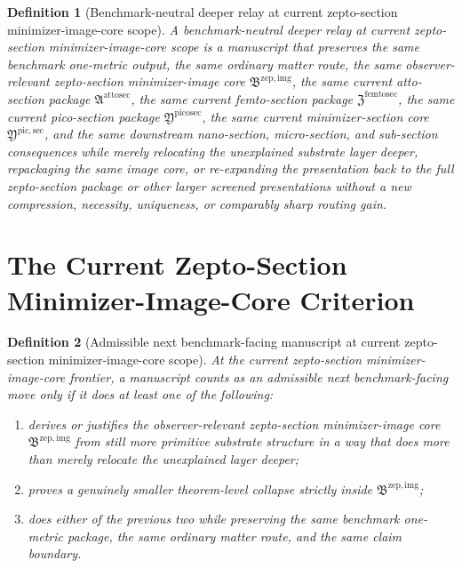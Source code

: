 \documentclass[11pt]{article}
\newcommand{\AttoSectionPackage}{\mathfrak A^{\mathrm{attosec}}}
\newcommand{\ZeptoImageCore}{\mathfrak B^{\mathrm{zep,img}}}
\newcommand{\FemtoSectionPackage}{\mathfrak Z^{\mathrm{femtosec}}}
\newcommand{\PicoSectionPackage}{\mathfrak Y^{\mathrm{picosec}}}
\newcommand{\PicoMinSectionCore}{\mathfrak Y^{\mathrm{pic,sec}}}
\newtheorem{definition}{Definition}
\begin{document}
\begin{definition}[Benchmark-neutral deeper relay at current zepto-section minimizer-image-core scope]
A \emph{benchmark-neutral deeper relay at current zepto-section minimizer-image-core scope} is a manuscript that preserves the same benchmark one-metric output, the same ordinary matter route, the same observer-relevant zepto-section minimizer-image core \(\ZeptoImageCore\), the same current atto-section package \(\AttoSectionPackage\), the same current femto-section package \(\FemtoSectionPackage\), the same current pico-section package \(\PicoSectionPackage\), the same current minimizer-section core \(\PicoMinSectionCore\), and the same downstream nano-section, micro-section, and sub-section consequences while merely relocating the unexplained substrate layer deeper, repackaging the same image core, or re-expanding the presentation back to the full zepto-section package or other larger screened presentations without a new compression, necessity, uniqueness, or comparably sharp routing gain.
\end{definition}

\section{The Current Zepto-Section Minimizer-Image-Core Criterion}

\begin{definition}[Admissible next benchmark-facing manuscript at current zepto-section minimizer-image-core scope]
At the current zepto-section minimizer-image-core frontier, a manuscript counts as an admissible next benchmark-facing move only if it does at least one of the following:
\begin{enumerate}
    \item derives or justifies the observer-relevant zepto-section minimizer-image core \(\ZeptoImageCore\) from still more primitive substrate structure in a way that does more than merely relocate the unexplained layer deeper;
    \item proves a genuinely smaller theorem-level collapse strictly inside \(\ZeptoImageCore\);
    \item does either of the previous two while preserving the same benchmark one-metric package, the same ordinary matter route, and the same claim boundary.
\end{enumerate}
\end{definition}
\end{document}
